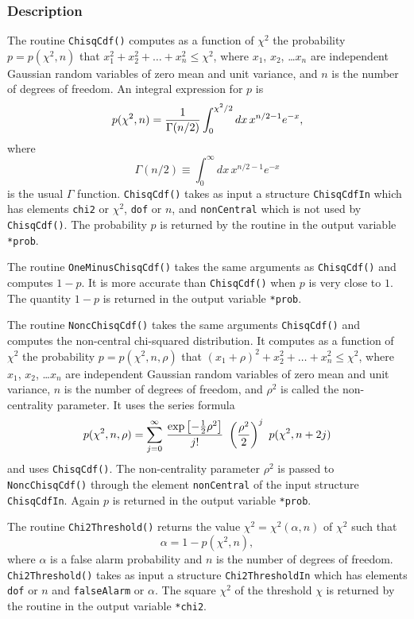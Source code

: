 \subsubsection*{Description}

The routine \verb+ChisqCdf()+ computes as a function of $\chi^2$ the
probability $p = p(\chi^2,n)$ that $x_1^2 + x_2^2 + \ldots + x_n^2 \le \chi^2$,
where $x_1$, $x_2$, \ldots $x_n$ are independent Gaussian random
variables of zero mean and unit variance, and $n$ is the number of
degrees of freedom.  An integral expression for $p$ is
$$
p(\chi^2,n) = {1 \over \Gamma(n/2)} \int_0^{\chi^2/2} dx \, x^{n/2-1} e^{-x},
$$
where 
$$
\Gamma(n/2) \equiv \int_0^\infty dx \, x^{n/2-1} e^{-x}
$$
is the usual $\Gamma$ function.  \verb+ChisqCdf()+ takes as input a
structure \verb+ChisqCdfIn+ which has elements \verb+chi2+ or
$\chi^2$, \verb+dof+ or $n$, and \verb+nonCentral+ which is not used
by \verb+ChisqCdf()+.  The probability $p$ is returned by the routine 
in the output variable \verb+*prob+.


The routine \verb+OneMinusChisqCdf()+ takes the same arguments as
\verb+ChisqCdf()+ and computes $1-p$.  It is more accurate than
\verb+ChisqCdf()+ when $p$ is very close to $1$.  The quantity $1-p$
is returned in the output variable \verb+*prob+.


The routine \verb+NoncChisqCdf()+ takes the same arguments
\verb+ChisqCdf()+ and computes the non-central chi-squared
distribution.  It computes as a function of $\chi^2$ the
probability $p = p(\chi^2,n,\rho)$ that $(x_1+\rho)^2 + x_2^2 + \ldots
+ x_n^2 \le \chi^2$, 
where $x_1$, $x_2$, \ldots $x_n$ are independent Gaussian random
variables of zero mean and unit variance, $n$ is the number of
degrees of freedom, and $\rho^2$ is called the non-centrality
parameter.  It uses the series formula
$$
p(\chi^2,n,\rho) = \sum_{j=0}^\infty \, { \exp\left[ -{1 \over 2}
\rho^2 \right] \over j!} \ \left( {\rho^2 \over 2} \right)^j \
p(\chi^2,n+2j)
$$
and uses \verb+ChisqCdf()+.  The non-centrality parameter
$\rho^2$ is passed to \verb+NoncChisqCdf()+ through the element
\verb+nonCentral+ of the input structure \verb+ChisqCdfIn+.
Again $p$ is returned in the output variable \verb+*prob+.



The routine \verb+Chi2Threshold()+ returns the value $\chi^2 =
\chi^2(\alpha,n)$ of $\chi^2$ such that 
$$
\alpha = 1 - p(\chi^2,n),
$$
where $\alpha$ is a false alarm probability and $n$ is the number of
degrees of freedom.  \verb+Chi2Threshold()+ takes as input a
structure \verb+Chi2ThresholdIn+ which has elements \verb+dof+ or
$n$ and \verb+falseAlarm+ or $\alpha$.  The square $\chi^2$ of the
threshold $\chi$ is returned by the routine in the output variable
\verb+*chi2+. 




